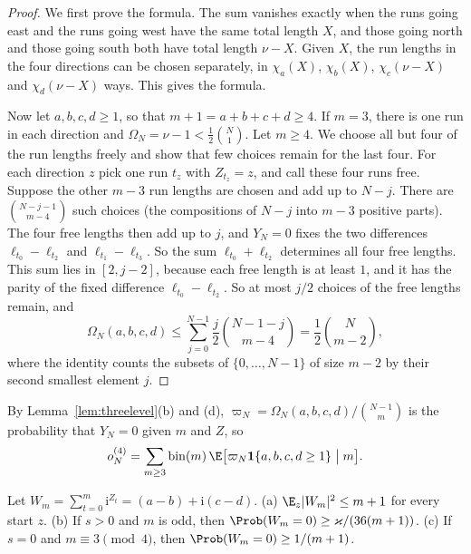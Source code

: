 \begin{proof}
We first prove the formula. The sum vanishes exactly when the runs going east and the runs going
west have the same total length $X$, and those going north and those going south both have total
length $\nu-X$. Given $X$, the run lengths in the four directions can be chosen separately, in
$\chi_a(X)$, $\chi_b(X)$, $\chi_c(\nu-X)$ and $\chi_d(\nu-X)$ ways. This gives the formula.

Now let $a,b,c,d\ge1$, so that $m+1=a+b+c+d\ge4$. If $m=3$, there is one run in each direction and
$\Omega_N=\nu-1<\frac12\binom N1$. Let $m\ge4$. We choose all but four of the run lengths freely and
show that few choices remain for the last four. For each direction $z$ pick one run $t_z$ with
$Z_{t_z}=z$, and call these four runs free. Suppose the other $m-3$ run lengths are chosen and add
up to $N-j$. There are $\binom{N-j-1}{m-4}$ such choices (the compositions of $N-j$ into $m-3$
positive parts). The four free lengths then add up to $j$, and $Y_N=0$ fixes the two differences
$\ell_{t_0}-\ell_{t_2}$ and $\ell_{t_1}-\ell_{t_3}$. So the sum $\ell_{t_0}+\ell_{t_2}$ determines
all four free lengths. This sum lies in $[2,j-2]$, because each free length is at least $1$, and it
has the parity of the fixed difference $\ell_{t_0}-\ell_{t_2}$. So at most $j/2$ choices of the free
lengths remain, and
\[
 \Omega_N(a,b,c,d)\le\sum_{j=0}^{N-1}\frac j2\binom{N-1-j}{m-4}=\frac12\binom N{m-2},
\]
where the identity counts the subsets of $\{0,\dots,N-1\}$ of size $m-2$ by their second smallest
element $j$.
\end{proof}

By Lemma~\ref{lem:threelevel}(b) and (d), $\varpi_N=\Omega_N(a,b,c,d)/\binom{N-1}m$ is the probability that
$Y_N=0$ given $m$ and $Z$, so
\begin{equation}\label{eq:app-planar-o4}
 o^{(4)}_N=\sum_{m\ge3}\mathrm{bin}(m)\,\E\bigl[\varpi_N\mathbf 1\{a,b,c,d\ge1\}\bigm|m\bigr].
\end{equation}

\begin{lemma}\label{lem:skelreturn}
Let $W_m=\sum_{t=0}^m\mathrm i^{Z_t}=(a-b)+\mathrm i(c-d)$.
\textup{(a)} $\E_z\lvert W_m\rvert^2\le m+1$ for every start $z$.
\textup{(b)} If $s>0$ and $m$ is odd, then $\Prob(W_m=0)\ge\varkappa/(36(m+1))$.
\textup{(c)} If $s=0$ and $m\equiv3\pmod4$, then $\Prob(W_m=0)\ge1/(m+1)$.
\end{lemma}

